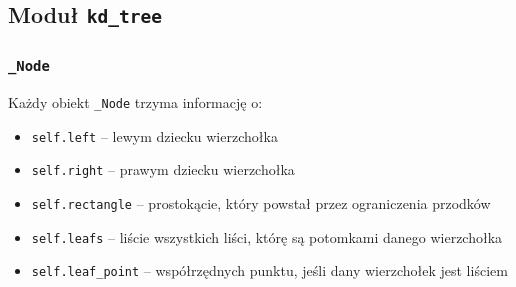 \documentclass[11pt]{scrartcl}
\begin{document}
\newpage

\subsection{Moduł \texttt{kd\_tree}}

\subsubsection{\texttt{\_Node}}
Każdy obiekt \texttt{\_Node} trzyma informację o:
\begin{itemize}
    \item \texttt{self.left} -- lewym dziecku wierzchołka
    \item \texttt{self.right} -- prawym dziecku wierzchołka
    \item \texttt{self.rectangle} -- prostokącie, który powstał przez ograniczenia przodków
    \item \texttt{self.leafs} -- liście wszystkich liści, którę są potomkami danego wierzchołka
    \item \texttt{self.leaf\_point} -- współrzędnych punktu, jeśli dany wierzchołek jest liściem
\end{itemize}
\end{document}
